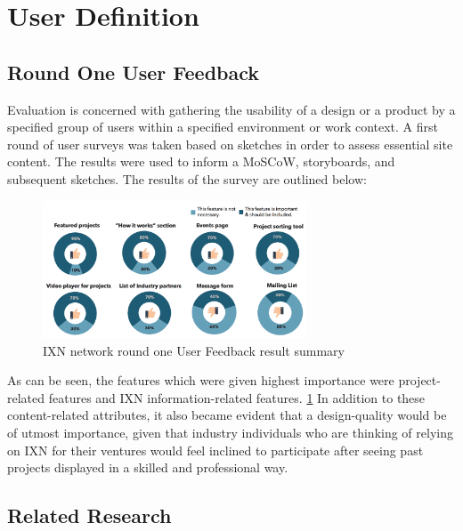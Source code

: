 \documentclass[fontsize=10pt]{extarticle}
\numberwithin{figure}{section} %
\begin{document}
\hypertarget{user-definition}{%
\section{User Definition}\label{user-definition}}

\hypertarget{round-one-user-feedback}{%
\subsection{Round One User Feedback}\label{round-one-user-feedback}}

Evaluation is concerned with gathering the usability of a design or a
product by a specified group of users within a specified environment or
work context. A first round of user surveys was taken based on sketches
in order to assess essential site content. The results were used to
inform a MoSCoW, storyboards, and subsequent sketches. The results of
the survey are outlined below:

\begin{figure}[H]
      \centering
      \includegraphics[trim = 0 0 0 0, clip, width=0.7\textwidth]{ph3.png}
      \caption{IXN network round one User Feedback result summary}
\label{userfeedback}
 \end{figure}

As can be seen, the features which were given highest importance were
project-related features and IXN information-related features.
\ref{userfeedback} In addition to these content-related attributes, it
also became evident that a design-quality would be of utmost importance,
given that industry individuals who are thinking of relying on IXN for
their ventures would feel inclined to participate after seeing past
projects displayed in a skilled and professional way.

\hypertarget{related-research}{%
\subsection{Related Research}\label{related-research}}
\end{document}
